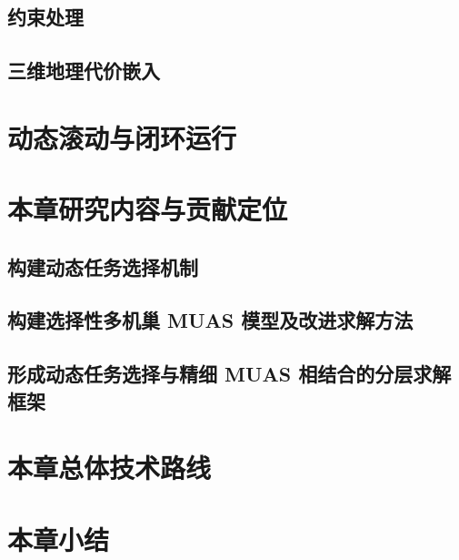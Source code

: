 \subsection{约束处理}
\subsection{三维地理代价嵌入}

\section{动态滚动与闭环运行}

\section{本章研究内容与贡献定位}
\subsection{构建动态任务选择机制}
\subsection{构建选择性多机巢 MUAS 模型及改进求解方法}
\subsection{形成动态任务选择与精细 MUAS 相结合的分层求解框架}

\section{本章总体技术路线}

\section{本章小结}

